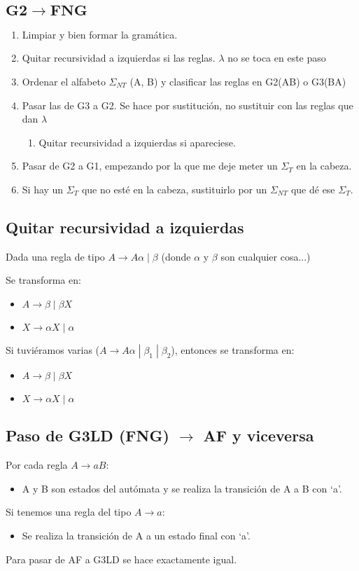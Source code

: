 \documentclass[12pt, twoside, openright]{report} %
\begin{document}
\subsection{$\boldsymbol{G2 \rightarrow FNG}$}
\begin{enumerate}
	\item Limpiar y bien formar la gramática.
	\item Quitar recursividad a izquierdas si las reglas. $\lambda$ no se toca en este paso
	\item Ordenar el alfabeto $\Sigma_{NT}$ (A, B) y clasificar las reglas en G2(AB) o G3(BA)
	\item Pasar las de G3 a G2. Se hace por sustitución, no sustituir con las reglas que dan $\lambda$
	      \begin{enumerate}
		      \item Quitar recursividad a izquierdas si apareciese.
	      \end{enumerate}
	\item Pasar de G2 a G1, empezando por la que me deje meter un $\Sigma_T$ en la cabeza.
	\item Si hay un $\Sigma_T$ que no esté en la cabeza, sustituirlo por un $\Sigma_{NT}$ que dé ese $\Sigma_T$.
\end{enumerate}

\subsection{Quitar recursividad a izquierdas}
Dada una regla de tipo $A \rightarrow A\alpha \; | \; \beta$ (donde $\alpha$ y $\beta$ son cualquier cosa...)

Se transforma en:
\begin{itemize}
	\item $A \rightarrow \beta \; | \; \beta X$
	\item $X \rightarrow \alpha X \; | \; \alpha$
\end{itemize}
Si tuviéramos varias ($A \rightarrow A\alpha \; | \; \beta_1 \; | \; \beta_2$), entonces se transforma en:
\begin{itemize}
	\item $A \rightarrow \beta \; | \; \beta X$
	\item $X \rightarrow \alpha X \; | \; \alpha$
\end{itemize}

\subsection{Paso de G3LD (FNG) $\boldsymbol{\rightarrow}$ AF y viceversa}
Por cada regla $A \rightarrow aB$:
\begin{itemize}
	\item A y B son estados del autómata y se realiza la transición de A a B con ‘a’.
\end{itemize}
Si tenemos una regla del tipo $A \rightarrow a$:
\begin{itemize}
	\item Se realiza la transición de A a un estado final con ‘a’.
\end{itemize}
Para pasar de AF a G3LD se hace exactamente igual.
\end{document}
